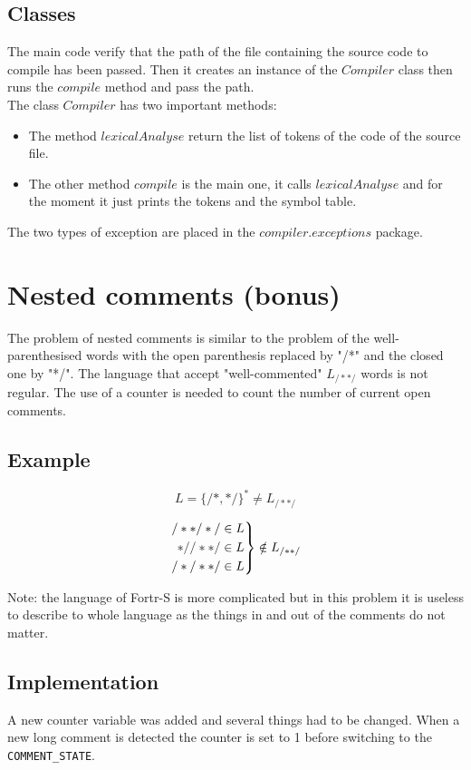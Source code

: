 \documentclass{article}
\begin{document}
\subsection{Classes}
\hspace{0.5cm} The main code verify that the path of the file containing the source code to compile has been passed. Then it creates an instance of the $Compiler$ class then runs the $compile$ method and pass the path.\\

The class $Compiler$ has two important methods:
\begin{itemize}
\item The method $lexicalAnalyse$ return the list of tokens of the code of the source file.
\item The other method $compile$ is the main one, it calls $lexicalAnalyse$ and for the moment it just prints the tokens and the symbol table.
\end{itemize}

The two types of exception are placed in the $compiler.exceptions$ package.

\section{Nested comments (bonus)}
The problem of nested comments is similar to the problem of the well-parenthesised words with the open parenthesis replaced by "/*" and the closed one by "*/". The language that accept "well-commented" $L_{/**/}$ words is not regular. The use of a counter is needed to count the number of current open comments.

\subsection{Example}
$$
L = \{/*,*/\}^* \ne L_{/**/}
$$

\begin{equation}
  \notag
  \left.\begin{aligned}
  /**/*/\in L\\
  *//**/\in L\\
  /*/**/\in L
\end{aligned}\right\} \notin L_{/**/}
\end{equation}

Note: the language of Fortr-S is more complicated but in this problem it is useless to describe to whole language as the things in and out of the comments do not matter.

\subsection{Implementation}
A new counter variable was added and several things had to be changed.
When a new long comment is detected the counter is set to 1 before switching to the \texttt{COMMENT\_STATE}.\\
\end{document}
